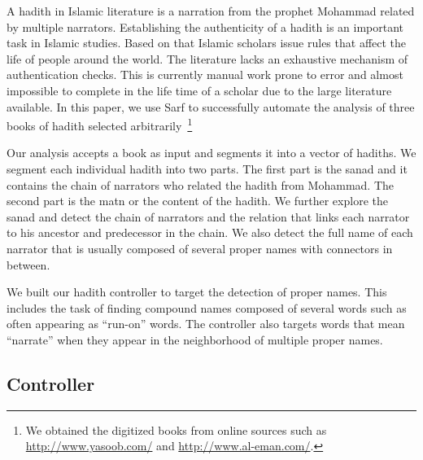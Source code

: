 \documentclass[11pt]{article}
\begin{document}
A hadith in Islamic literature is a narration from the prophet Mohammad
related by multiple narrators.
Establishing the authenticity of a hadith is an important task
in Islamic studies. 
Based on that Islamic scholars issue rules that affect the life
of people around the world. 
The literature lacks an exhaustive mechanism of authentication
checks. This is currently manual work prone to error and almost
impossible to complete in the life time of a scholar due to the
large literature available. 
In this paper, we use Sarf to successfully automate the
analysis of three books of hadith selected 
arbitrarily~\cite{IbnHanbal,AlKulayni,AlTousi}\footnote{We obtained
  the digitized books from online sources such as 
  \href{http://www.yasoob.com/}{http://www.yasoob.com/} and 
  \href{http://www.al-eman.com/}{http://www.al-eman.com/}. }



Our analysis accepts a book as input
and segments it into a vector of hadiths. 
We segment each individual hadith into two parts. 
The first part is the sanad and it
contains the chain of narrators who related the hadith
from Mohammad. 
The second part is the matn or the content
of the hadith. 
We further explore the sanad and
detect the chain of narrators and 
the relation that links each narrator to his ancestor and 
predecessor in the chain. 
We also detect the full name of each narrator that is
usually composed of several proper names with connectors
in between. 

We built our hadith controller to target
the detection of proper names. 
This includes the task of finding compound names 
composed of several words such as  often
appearing as ``run-on'' words.
The controller also targets words that mean ``narrate'' when
they appear in the neighborhood of multiple proper names. 

\subsection{Controller}
\label{sec:controller}
\end{document}
